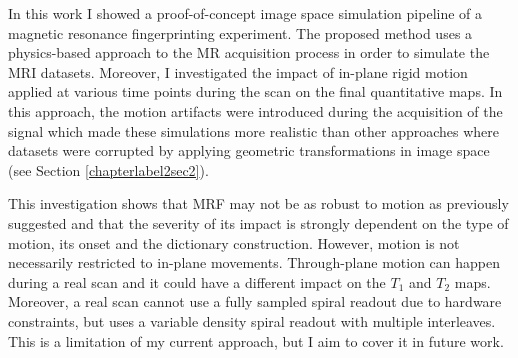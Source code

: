 
In this work I showed a proof-of-concept image space simulation pipeline of a magnetic resonance fingerprinting experiment.
The proposed method uses a physics-based approach to the MR acquisition process in order to simulate the MRI datasets.
Moreover, I investigated the impact of in-plane rigid motion applied at various time points during the scan on the final quantitative maps.
In this approach, the motion artifacts were introduced during the acquisition of the signal which made these simulations more realistic than other approaches where datasets were corrupted by applying geometric transformations in image space (see Section \ref{chapterlabel2sec2}).

\hfill

This investigation shows that MRF may not be as robust to motion as previously suggested and that the severity of its impact is strongly dependent on the type of motion, its onset and the dictionary construction.
However, motion is not necessarily restricted to in-plane movements.
Through-plane motion can happen during a real scan and it could have a different impact on the $T_1$ and $T_2$ maps.
Moreover, a real scan cannot use a fully sampled spiral readout due to hardware constraints, but uses a variable density spiral readout with multiple interleaves.
This is a limitation of my current approach, but I aim to cover it in future work.